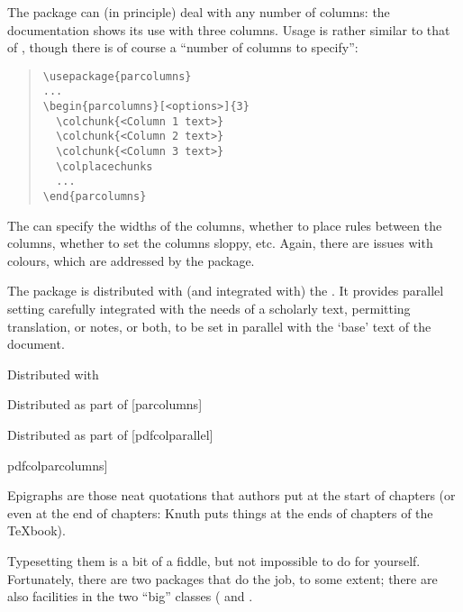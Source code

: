 The  package can (in principle) deal with any
number of columns: the documentation shows its use with three
columns.  Usage is rather similar to that of ,
though there is of course a ``number of columns to specify'':
\begin{quote}
\begin{verbatim}
\usepackage{parcolumns}
...
\begin{parcolumns}[<options>]{3}
  \colchunk{<Column 1 text>}
  \colchunk{<Column 2 text>}
  \colchunk{<Column 3 text>}
  \colplacechunks
  ...
\end{parcolumns}
\end{verbatim}
\end{quote}
The  can specify the widths of the columns, whether to
place rules between the columns, whether to set the columns sloppy,
etc.  Again, there are issues with colours, which are addressed by the
 package.

The  package is distributed with (and integrated with)
the .  It provides parallel
setting carefully integrated with the needs of a scholarly text,
permitting translation, or notes, or both, to be set in parallel with
the `base' text of the document.
\begin{ctanrefs}
\item[ledpar.sty]Distributed with 
\item[parallel.sty]
\item[parcolumns.sty]Distributed as part of [parcolumns]
\item[pdfcolparallel.sty]Distributed as part of [pdfcolparallel]
\item[pdfcolparcolumns.sty]pdfcolparcolumns]
\end{ctanrefs}


Epigraphs are those neat quotations that authors put at the start of
chapters (or even at the end of chapters: Knuth puts things at the
ends of chapters of the \TeX{}book).

Typesetting them is a bit of a fiddle, but not impossible to do for
yourself.  Fortunately, there are two packages that do the job, to
some extent; there are also facilities in the two ``big'' classes
( and .

